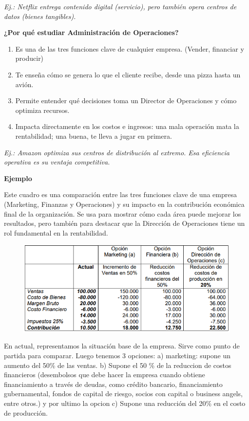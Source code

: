 \documentclass[a4paper,oneside,11pt]{article}
\begin{document}
\textit{Ej.: Netflix entrega contenido digital (servicio), pero también opera centros de datos (bienes tangibles).}

\textbf{¿Por qué estudiar Administración de Operaciones?}

\begin{enumerate}
    \item Es una de las tres funciones clave de cualquier empresa. (Vender, financiar y producir)
    \item Te enseña cómo se genera lo que el cliente recibe, desde una pizza hasta un avión.
    \item Permite entender qué decisiones toma un Director de Operaciones y cómo optimiza recursos.
    \item Impacta directamente en los costos e ingresos: una mala operación mata la rentabilidad; una buena, te lleva a jugar en primera.
\end{enumerate}
\textit{Ej.: Amazon optimiza sus centros de distribución al extremo. Esa eficiencia operativa es su ventaja competitiva.}


\textbf{Ejemplo}

Este cuadro es una comparación entre las tres funciones clave de una empresa (Marketing, Finanzas y Operaciones) y su impacto en la contribución económica final de la organización. Se usa para mostrar cómo cada área puede mejorar los resultados, pero también para destacar que la Dirección de Operaciones tiene un rol fundamental en la rentabilidad.

\begin{figure} [ht!]
    \centering
    \includegraphics[scale=.6]{cuadro_do.png}
\end{figure}

En actual, representamos la situación base de la empresa. Sirve como punto de partida para comparar. Luego tenemos 3 opciones: a) marketing: supone un aumento del 50\% de las ventas. b) Supone el 50 \% de la reduccion de costos financieros (desembolsos que debe hacer la empresa cuando obtiene financiamiento a través de deudas, como crédito bancario, financiamiento gubernamental, fondos de capital de riesgo, socios con capital o business angels, entre otros.) y por ultimo la opcion c) Supone una reducción del 20\% en el costo de producción.
\end{document}
